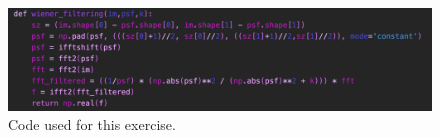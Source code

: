 \begin{figure}[H]
	\centering
	\includegraphics[width=\linewidth]{Materials/E5/E53code}
	\caption{Code used for this exercise.}
	\label{E53code}
\end{figure}